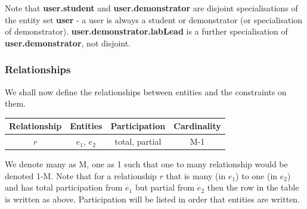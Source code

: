 Note that \textbf{user.student} and \textbf{user.demonstrator} are disjoint specialisations of the entity set \textbf{user} - a user is always a student or demonstrator (or specialisation of demonstrator). \textbf{user.demonstrator.labLead} is a further specialisation of \textbf{user.demonstrator}, not disjoint. 

\subsubsection{Relationships}
We shall now define the relationships between entities and the constraints on them. 

\FloatBarrier
\begin{table}[H]
\centering
\begin{tabular}{ |c|c|c|c| } 
 \hline
 \textbf{Relationship} & \textbf{Entities} & \textbf{Participation} & \textbf{Cardinality}\\ 
 \hline
 $r$ & $e_1$, $e_2$ & total, partial & M-1 \\
 \hline
\end{tabular}
\end{table}
\FloatBarrier 

We denote many as M, one as 1 such that one to many relationship would be denoted 1-M. Note that for a relationship $r$ that is many (in $e_1$) to one (in $e_2$) and has total participation from $e_1$ but partial from $e_2$ then the row in the table is written as above. Participation will be listed in order that entities are written.

\FloatBarrier
\begin{table}[htbp]
\centering
{}
\caption{Table showing entities, relationships between, relationship attributes, participation and cardinality.}
\end{table}
\FloatBarrier

